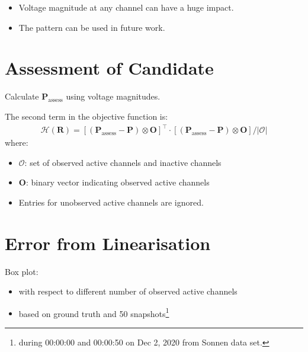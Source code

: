 \documentclass[
]{book}
\providecommand{\tightlist}{%
  \setlength{\itemsep}{0pt}\setlength{\parskip}{0pt}}
\begin{document}
\begin{itemize}
\tightlist
\item
  Voltage magnitude at any channel can have a huge impact.
\item
  The pattern can be used in future work.
\end{itemize}

\hypertarget{assessment}{%
\section{Assessment of Candidate}\label{assessment}}

Calculate \(\boldsymbol{P}_\text{assess}\) using voltage magnitudes.

The second term in the objective function is:
\[ \begin{aligned}
  \mathcal{H}(\boldsymbol{R}) =
  \left[
    (\boldsymbol{P}_\text{assess} - \boldsymbol{P})
    \otimes \boldsymbol{O}
  \right]^\top
  \cdot \left[
    (\boldsymbol{P}_\text{assess} - \boldsymbol{P})
    \otimes \boldsymbol{O}
  \right]
  / |\mathcal{O}|
\end{aligned} \]
where:

\begin{itemize}
\tightlist
\item
  \(\mathcal{O}\): set of observed active channels and inactive channels
\item
  \(\boldsymbol{O}\): binary vector indicating observed active channels
\item
  Entries for unobserved active channels are ignored.
\end{itemize}

\hypertarget{error}{%
\section{Error from Linearisation}\label{error}}

Box plot:

\begin{itemize}
\tightlist
\item
  with respect to different number of observed active channels
\item
  based on ground truth and 50 snapshots\footnote{during 00:00:00 and 00:00:50 on Dec
    2, 2020 from Sonnen data set.}
\end{itemize}
\end{document}
